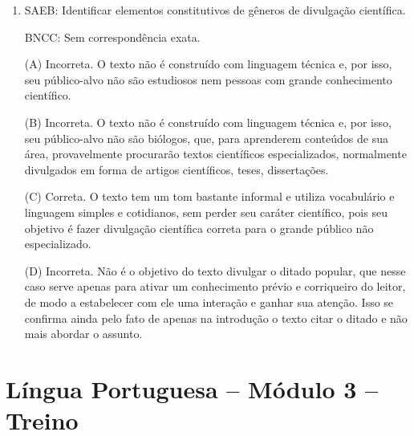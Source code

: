 \begin{enumerate}
(D) Correta. O
texto jornalístico, em geral, preza pela objetividade e pela isenção.
Uma das formas de atender a esses requisitos é citar entre aspas as
palavras de outrem. No texto em questão, as aspas foram usadas para
evitar assumir a responsabilidade por uma afirmação categórica feita, na
realidade, por uma instituição que tem legitimidade para tal (a
Organização Pan-Americana de Saúde). Isso significa que tal instituição
tem maior credibilidade, de modo que as aspas servem, ao mesmo tempo,
para comprovar que a notícia veicula informações reais já confirmadas
por instituição competente.

\item

SAEB: Identificar elementos constitutivos de gêneros de divulgação
científica.

BNCC: Sem correspondência exata.

(A) Incorreta. O texto não é construído com linguagem técnica e, por
isso, seu público-alvo não são estudiosos nem pessoas com grande
conhecimento científico.

(B) Incorreta. O texto não é construído com linguagem técnica e, por
isso, seu público-alvo não são biólogos, que, para aprenderem conteúdos
de sua área, provavelmente procurarão textos científicos especializados,
normalmente divulgados em forma de artigos científicos, teses,
dissertações.

(C) Correta. O texto tem um tom bastante informal e utiliza vocabulário
e linguagem simples e cotidianos, sem perder seu caráter científico,
pois seu objetivo é fazer divulgação científica correta para o grande
público não especializado.

(D) Incorreta. Não é o objetivo do texto divulgar o ditado popular, que
nesse caso serve apenas para ativar um conhecimento prévio e corriqueiro
do leitor, de modo a estabelecer com ele uma interação e ganhar sua
atenção. Isso se confirma ainda pelo fato de apenas na introdução o
texto citar o ditado e não mais abordar o assunto.
\end{enumerate}

\section*{Língua Portuguesa – Módulo 3 – Treino}

